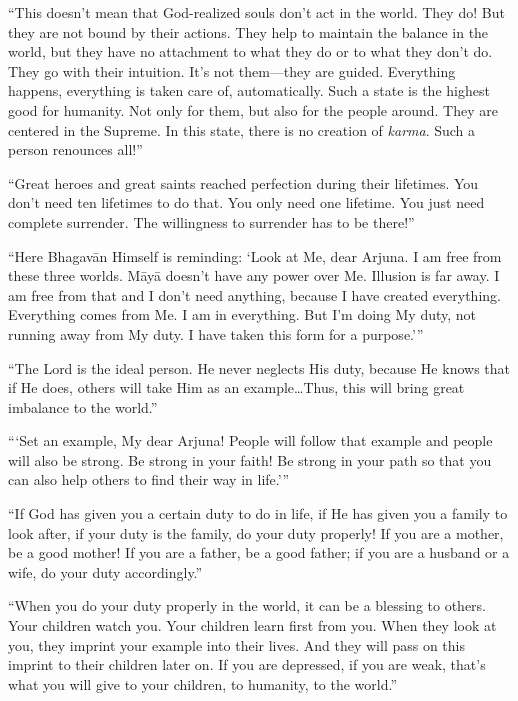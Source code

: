 \enquote{This doesn’t mean that God-realized souls don’t act in the world. They do! But they are not bound by their actions. They help to maintain the balance in the world, but they have no attachment to what they do or to what they don’t do. They go with their intuition. It’s not them---they are guided. Everything happens, everything is taken care of, automatically. Such a state is the highest good for humanity. Not only for them, but also for the people around. They are centered in the Supreme. In this state, there is no creation of \textit{karma}. Such a person renounces all!}


\enquote{Great heroes and great saints reached perfection during their lifetimes. You don’t need ten lifetimes to do that. You only need one lifetime. You just need complete surrender. The willingness to surrender has to be there!}

\enquote{Here Bhagavān Himself is reminding: \enquote{Look at Me, dear Arjuna. I am free from these three worlds. Māyā doesn’t have any power over Me. Illusion is far away. I am free from that and I don’t need anything, because I have created everything. Everything comes from Me. I am in everything. But I’m doing My duty, not running away from My duty. I have taken this form for a purpose.}}

\enquote{The Lord is the ideal person. He never neglects His duty, because He knows that if He does, others will take Him as an example\ldots Thus, this will bring great imbalance to the world.}

\enquote{\enquote{Set an example, My dear Arjuna! People will follow that example and people will also be strong. Be strong in your faith! Be strong in your path so that you can also help others to find their way in life.}}

\enquote{If God has given you a certain duty to do in life, if He has given you a family to look after, if your duty is the family, do your duty properly! If you are a mother, be a good mother! If you are a father, be a good father; if you are a husband or a wife, do your duty accordingly.}

\enquote{When you do your duty properly in the world, it can be a blessing to others. Your children watch you. Your children learn first from you. When they look at you, they imprint your example into their lives. And they will pass on this imprint to their children later on. If you are depressed, if you are weak, that’s what you will give to your children, to humanity, to the world.}

